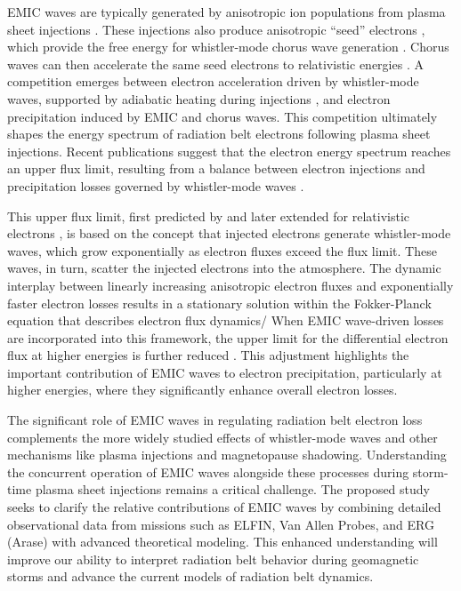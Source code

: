 \documentclass[
  letterpaper,
  DIV=11,
  numbers=noendperiod]{scrartcl}
\begin{document}
EMIC waves are typically generated by anisotropic ion populations from plasma sheet injections \citep{Jun19:emic}. These injections also produce anisotropic ``seed'' electrons \citep{Miyoshi13, Jaynes15:seedelectrons}, which provide the free energy for whistler-mode chorus wave generation \citep{Tao11, Fu14:radiation_belts, Zhang18:whistlers&injections}. Chorus waves can then accelerate the same seed electrons to relativistic energies \citep{miyoshiRebuildingProcessOuter2003, thorneRapidLocalAcceleration2013, mourenasApproximateAnalyticalSolutions2014, allisonLocalHeatingRadiation2020}. A competition emerges between electron acceleration driven by whistler-mode waves, supported by adiabatic heating during injections \citep[e.g.,][]{sorathiaModelingDepletionRecovery2018}, and electron precipitation induced by EMIC and chorus waves. This competition ultimately shapes the energy spectrum of radiation belt electrons following plasma sheet injections. Recent publications suggest that the electron energy spectrum reaches an upper flux limit, resulting from a balance between electron injections and precipitation losses governed by whistler-mode waves \citep{oliferTaleTwoRadiation2021, oliferNaturalLimitSpectral2022}.

This upper flux limit, first predicted by \citet{kennelLimitStablyTrapped1966} and later extended for relativistic electrons \citep{summersLimitStablyTrapped2009, summersLimitingEnergySpectrum2014}, is based on the concept that injected electrons generate whistler-mode waves, which grow exponentially as electron fluxes exceed the flux limit. These waves, in turn, scatter the injected electrons into the atmosphere. The dynamic interplay between linearly increasing anisotropic electron fluxes and exponentially faster electron losses results in a stationary solution within the Fokker-Planck equation that describes electron flux dynamics/ When EMIC wave-driven losses are incorporated into this framework, the upper limit for the differential electron flux at higher energies is further reduced \citep{mourenasExtremeEnergySpectra2022}. This adjustment highlights the important contribution of EMIC waves to electron precipitation, particularly at higher energies, where they significantly enhance overall electron losses.

The significant role of EMIC waves in regulating radiation belt electron loss complements the more widely studied effects of whistler-mode waves and other mechanisms like plasma injections and magnetopause shadowing. Understanding the concurrent operation of EMIC waves alongside these processes during storm-time plasma sheet injections remains a critical challenge. The proposed study seeks to clarify the relative contributions of EMIC waves by combining detailed observational data from missions such as ELFIN, Van Allen Probes, and ERG (Arase) with advanced theoretical modeling. This enhanced understanding will improve our ability to interpret radiation belt behavior during geomagnetic storms and advance the current models of radiation belt dynamics.
\end{document}
